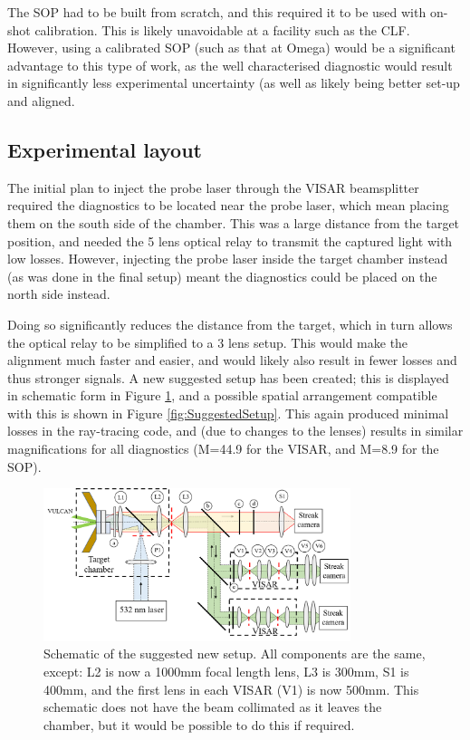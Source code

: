 The SOP had to be built from scratch, and this required it to be used with on-shot calibration. This is likely unavoidable at a facility such as the CLF. However, using a calibrated SOP (such as that at Omega) would be a significant advantage to this type of work, as the well characterised diagnostic would result in significantly less experimental uncertainty (as well as likely being better set-up and aligned.

\subsection{Experimental layout}

The initial plan to inject the probe laser through the VISAR beamsplitter required the diagnostics to be located near the probe laser, which mean placing them on the south side of the chamber. This was a large distance from the target position, and needed the 5 lens optical relay to transmit the captured light with low losses. However, injecting the probe laser inside the target chamber instead (as was done in the final setup) meant the diagnostics could be placed on the north side instead.

Doing so significantly reduces the distance from the target, which in turn allows the optical relay to be simplified to a 3 lens setup. This would make the alignment much faster and easier, and would likely also result in fewer losses and thus stronger signals. A new suggested setup has been created; this is displayed in schematic form in Figure \ref{fig:SuggestedSchematic}, and a possible spatial arrangement compatible with this is shown in Figure \ref{fig:SuggestedSetup}. This again produced minimal losses in the ray-tracing code, and (due to changes to the lenses) results in similar magnifications for all diagnostics (M=44.9 for the VISAR, and M=8.9 for the SOP).

\begin{figure}
\begin{centering}
\includegraphics[width=0.8\textwidth]{figures/Experiment/SuggestedSchematic.png}%
\caption{\label{fig:SuggestedSchematic} Schematic of the suggested new setup. All components are the same, except: L2 is now a 1000mm focal length lens, L3 is 300mm, S1 is 400mm, and the first lens in each VISAR (V1) is now 500mm. This schematic does not have the beam collimated as it leaves the chamber, but it would be possible to do this if required.}
\end{centering}
\end{figure}

